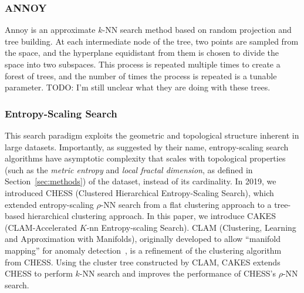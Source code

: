 \subsubsection{ANNOY}
\label{subsubsec:introduction:related-works:annoy}

Annoy is an approximate $k$-NN search method based on random projection and tree building.
At each intermediate node of the tree, two points are sampled from the space, and the hyperplane equidistant from them is chosen to divide the space into two subspaces.
This process is repeated multiple times to create a forest of trees, and the number of times the process is repeated is a tunable parameter.
{\color{red} TODO: I'm still unclear what they are doing with these trees.}

\subsubsection{Entropy-Scaling Search}
\label{subsubsec:introduction:related-works:entropy-scaling-search}

This search paradigm exploits the geometric and topological structure inherent in large datasets.
Importantly, as suggested by their name, entropy-scaling search algorithms have asymptotic complexity that scales with topological properties (such as the \emph{metric entropy} and \emph{local fractal dimension}, as defined in Section~\ref{sec:methods}) of the dataset, instead of its cardinality.
In 2019, we introduced CHESS (Clustered Hierarchical Entropy-Scaling Search), which extended entropy-scaling $\rho$-NN search from a flat clustering approach to a tree-based hierarchical clustering approach.
In this paper, we introduce CAKES (CLAM-Accelerated $K$-nn Entropy-scaling Search).
CLAM (Clustering, Learning and Approximation with Manifolds), originally developed to allow ``manifold mapping'' for anomaly detection~\cite{ishaq2021clustered}, is a refinement of the clustering algorithm from CHESS.
Using the cluster tree constructed by CLAM, CAKES extends CHESS to perform $k$-NN search and improves the performance of CHESS's $\rho$-NN search.
